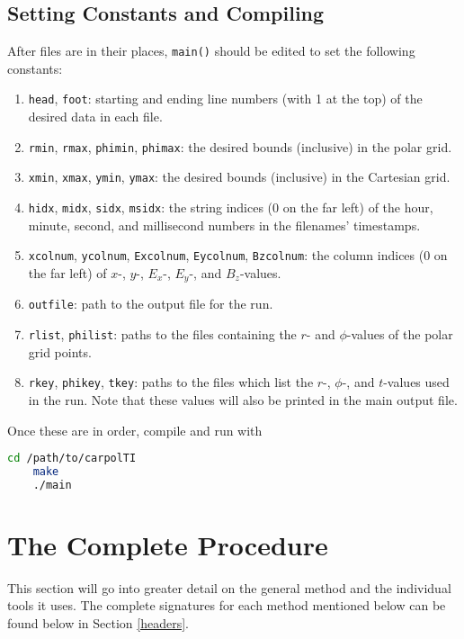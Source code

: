 \documentclass[hidelinks,12pt]{article}
\begin{document}
\subsection{Setting Constants and Compiling}
After files are in their places, \texttt{main()} should be edited to set the following constants:
\begin{enumerate}[label={$\cdot$},leftmargin={1cm},rightmargin={1cm}]
    \item \texttt{head}, \texttt{foot}: starting and ending line numbers (with 1 at the top) of the desired data in each file.
    \item \texttt{rmin}, \texttt{rmax}, \texttt{phimin}, \texttt{phimax}: the desired bounds (inclusive) in the polar grid.
    \item \texttt{xmin}, \texttt{xmax}, \texttt{ymin}, \texttt{ymax}: the desired bounds (inclusive) in the Cartesian grid.
    \item \texttt{hidx}, \texttt{midx}, \texttt{sidx}, \texttt{msidx}: the string indices (0 on the far left) of the hour, minute, second, and millisecond numbers in the filenames' timestamps.
    \item \texttt{xcolnum}, \texttt{ycolnum}, \texttt{Excolnum}, \texttt{Eycolnum}, \texttt{Bzcolnum}: the column indices (0 on the far left) of $x$-, $y$-, $E_{x}$-, $E_{y}$-, and $B_{z}$-values.
    \item \texttt{outfile}: path to the output file for the run.
    \item \texttt{rlist}, \texttt{philist}: paths to the files containing the $r$- and $\phi$-values of the polar grid points.
    \item \texttt{rkey}, \texttt{phikey}, \texttt{tkey}: paths to the files which list the $r$-, $\phi$-, and $t$-values used in the run. Note that these values will also be printed in the main output file.
\end{enumerate}
Once these are in order, compile and run with
\begin{lstlisting}[language=bash]
    cd /path/to/carpolTI
    make
    ./main
\end{lstlisting}

\section{The Complete Procedure}\label{procedure}
This section will go into greater detail on the general method and the individual tools it uses. The complete signatures for each method mentioned below can be found below in Section \ref{headers}.
\end{document}
